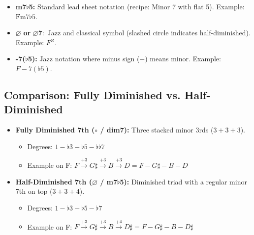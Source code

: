 \begin{itemize}
    \item \textbf{m7}$\flat$\textbf{5:} Standard lead sheet notation (recipe: Minor 7 with flat 5). Example: $\text{Fm7}\flat 5$.
    \item $\varnothing$ \textbf{or} $\varnothing\mathbf{7:}$ Jazz and classical symbol (slashed circle indicates half-diminished). Example: $F^\varnothing$.
    \item \textbf{-7(}$\flat$\textbf{5):} Jazz notation where minus sign ($-$) means minor. Example: $F-7(\flat 5)$.
\end{itemize}

\subsection{Comparison: Fully Diminished vs. Half-Diminished}

\begin{itemize}
    \item \textbf{Fully Diminished 7th ($\circ$ / dim7):} Three stacked minor 3rds ($3 + 3 + 3$).
    \begin{itemize}
        \item Degrees: $1 - \flat 3 - \flat 5 - \flat\flat 7$
        \item Example on F: $F \xrightarrow{+3} G\sharp \xrightarrow{+3} B \xrightarrow{+3} D = F - G\sharp - B - D$
    \end{itemize}
    \item \textbf{Half-Diminished 7th ($\varnothing$ / m7$\flat$5):} Diminished triad with a regular minor 7th on top ($3 + 3 + 4$).
    \begin{itemize}
        \item Degrees: $1 - \flat 3 - \flat 5 - \flat 7$
        \item Example on F: $F \xrightarrow{+3} G\sharp \xrightarrow{+3} B \xrightarrow{+4} D\sharp = F - G\sharp - B - D\sharp$
    \end{itemize}
\end{itemize}
